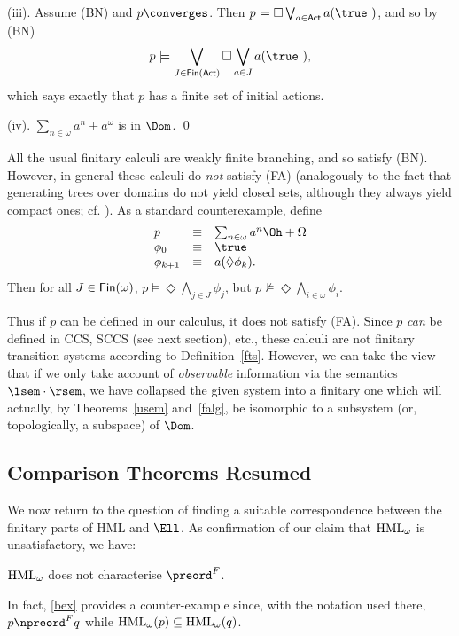 \noindent (iii). Assume (BN) and $p \converges$.
Then $p \models \Box \bigvee_{a \in {\sf Act}} a(\true\ )$, and so by (BN)
\[ p \models \bigvee_{J \in {\sf Fin}({\sf Act})} \Box \bigvee_{a \in J} a(\true\ ) , \]
which says exactly that $p$ has a finite set of initial actions.

\noindent (iv). $\sum_{n \in \omega} a^{n} + a^{\omega}$ is in $\Dom$. \qed

All the usual finitary  calculi are weakly finite branching, and so satisfy (BN).
However, in general these calculi do {\em not} satisfy (FA) (analogously to the fact that generating trees over domains do not yield closed sets, although they always yield compact ones; cf. \cite{PloLN}).
As a standard counterexample, define
\[ \begin{array}{lll}
p & \equiv & \sum_{n \in \omega} a^{n} \Oh + \Omega \\
\phi_{0} & \equiv & \true\  \\
\phi_{k + 1} & \equiv & a(\Diamond \phi_{k}) .
\end{array} \]
Then for all $J \in {\sf Fin}(\omega )$, $p \models \Diamond \bigwedge_{j \in J} \phi_{j}$, but $p \nvDash \Diamond \bigwedge_{i \in \omega} \phi_{i}$.

Thus if $p$ can be defined in our calculus, it does not satisfy (FA).
Since $p$ {\em can} be defined in CCS, SCCS (see next section), etc., these calculi are not finitary transition systems according to Definition~\ref{fts}.
However, we can take the view that if we only take account of {\em observable} 
information via the semantics $\lsem \cdot \rsem$, we have collapsed the 
given system into a finitary one which will actually, 
by Theorems~\ref{usem} and~\ref{falg}, be isomorphic to a subsystem (or, topologically, a subspace) of $\Dom$.

\subsection*{Comparison Theorems Resumed}
We now return to the question of finding a suitable correspondence between the finitary parts of HML and $\Ell$.
As confirmation of our claim that ${\rm HML}_{\omega}$ is unsatisfactory, we have:

 ${\rm HML}_{\omega}$ does not characterise $\preord^{F}$.

In fact, \ref{bex} provides a counter-example since, with the notation used there, $p \npreord^{F} q$ while $ {\rm HML}_{\omega}(p) \subseteq {\rm HML}_{\omega}(q)$.

